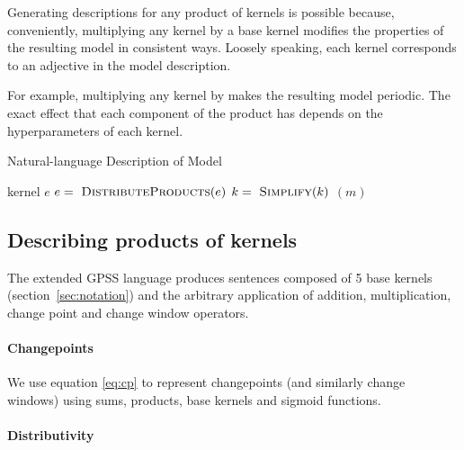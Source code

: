 \documentclass{article}
\begin{document}
Generating descriptions for any product of kernels is possible because, conveniently, multiplying any kernel by a base kernel modifies the properties of the resulting model in consistent ways. Loosely speaking, each kernel corresponds to an adjective in the model description.

For example, multiplying any kernel by \kPer makes the resulting model periodic.
The exact effect that each component of the product has depends on the hyperparameters of each kernel.


\begin{algorithm}[tb]
   \caption{Natural-language Description of Model}
   \label{alg:description}
\begin{algorithmic}
    kernel $e$
   \STATE $e = {\textnormal{ \sc DistributeProducts}}(e)$
       \STATE $k = {\textnormal{ \sc Simplify}}(k)$
             $(m)$
     \ENDFOR
   \ENDFOR
\end{algorithmic}
\end{algorithm}


\subsection{Describing products of kernels}

The extended GPSS language produces sentences composed of 5 base kernels (section~\ref{sec:notation}) and the arbitrary application of addition, multiplication, change point and change window operators. 

\paragraph{Changepoints}

We use equation \eqref{eq:cp} to represent changepoints (and similarly change windows) using sums, products, base kernels and sigmoid functions.

\paragraph{Distributivity}
\end{document}
